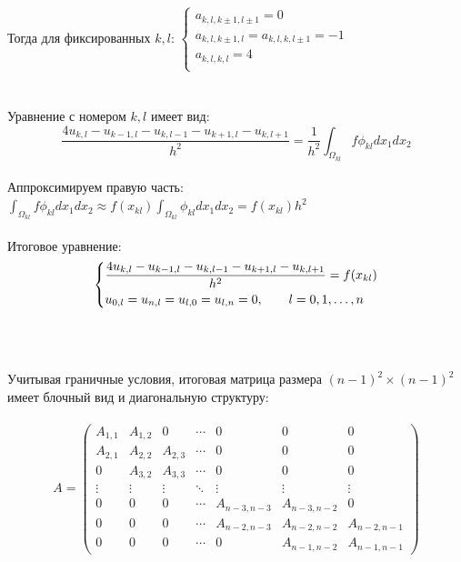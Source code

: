 \documentclass[12pt, a4paper]{article}
\begin{document}
	Тогда для фиксированных $k, l$:
	$
	\begin{cases}
		a_{k,l,k \pm 1,l \pm 1} = 0 \\
		a_{k,l,k \pm 1,l} = a_{k,l,k,l \pm 1} = -1 \\
		a_{k,l,k,l} = 4 \\
	\end{cases}
	$ \\\\\\
	Уравнение с номером $k, l$ имеет вид: \\
	\begin{equation*}
		\frac{4 u_{k,l} - u_{k-1,l} - u_{k,l-1} - u_{k+1,l} - u_{k,l+1}}{h^{2}} = 
			\frac{1}{h^{2}} \int_{\Omega_{kl}} f \phi_{kl} dx_1 dx_2
	\end{equation*} \\
	Аппроксимируем правую часть: 
	$
		\int_{\Omega_{kl}} f \phi_{kl} dx_1 dx_2 \approx
			f(x_{kl}) \int_{\Omega_{kl}} \phi_{kl} dx_1 dx_2 =
			f(x_{kl})h^{2} 
	$ \\\\
	Итоговое уравнение:
	\begin{equation*}
		\begin{dcases}
			\frac{4 u_{k,l} - u_{k-1,l} - u_{k,l-1} - u_{k+1,l} - u_{k,l+1}}{h^{2}} = f(x_{kl}) \\
			u_{0,l} = u_{n,l} = u_{l,0} = u_{l,n} = 0, \qquad l = 0, 1, \ldots, n
		\end{dcases}
	\end{equation*} \\\\\\
	Учитывая граничные условия, итоговая матрица размера $(n-1)^{2} \times (n-1)^{2}$ 
	имеет блочный вид и диагональную структуру: \\\\
	\begin{equation*}
	A =
		\begin{pmatrix}
			A_{1,1} & A_{1,2} & 0       & \cdots & 0           & 0           & 0           \\
			A_{2,1} & A_{2,2} & A_{2,3} & \cdots & 0           & 0           & 0           \\
			0       & A_{3,2} & A_{3,3} & \cdots & 0           & 0           & 0           \\
			\vdots  & \vdots  & \vdots  & \ddots & \vdots      & \vdots      & \vdots      \\
			0       & 0       &  0      & \cdots & A_{n-3,n-3} & A_{n-3,n-2} & 0           \\
			0       & 0       &  0      & \cdots & A_{n-2,n-3} & A_{n-2,n-2} & A_{n-2,n-1} \\
			0       & 0       &  0      & \cdots & 0           & A_{n-1,n-2} & A_{n-1,n-1}
		\end{pmatrix}
	\end{equation*} \\\\
\end{document}
